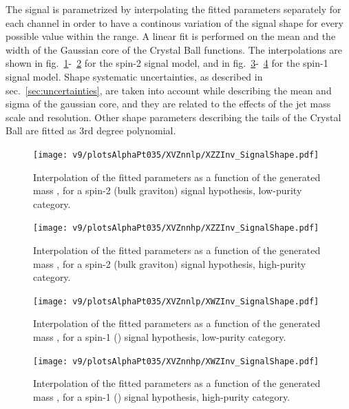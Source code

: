 The signal is parametrized by interpolating the fitted parameters separately for each channel in order to have a continous variation of the signal shape for every possible \mtVZ value within the range. A linear fit is performed on the mean and the width of the Gaussian core of the Crystal Ball functions. The interpolations are shown in fig.~\ref{fig:XZZ_SignalShapeLP}-~\ref{fig:XZZ_SignalShapeHP} for the spin-2 signal model, and in fig.~\ref{fig:XWZ_SignalShapeLP}-~\ref{fig:XWZ_SignalShapeHP} for the spin-1 signal model. Shape systematic uncertainties, as described in sec.~\ref{sec:uncertainties}, are taken into account while describing the mean and sigma of the gaussian core, and they are related to the effects of the jet mass scale and resolution. Other shape parameters describing the tails of the Crystal Ball are fitted as 3rd degree polynomial.


\begin{figure}[!htb]
  \centering
    \texttt{[image: v9/plotsAlphaPt035/XVZnnlp/XZZInv\_SignalShape.pdf]}
  \caption{Interpolation of the fitted parameters as a function of the generated mass \mtVZ, for a spin-2 (bulk graviton) signal hypothesis, low-purity category.}
  \label{fig:XZZ_SignalShapeLP}
\end{figure}

\begin{figure}[!htb]
  \centering
    \texttt{[image: v9/plotsAlphaPt035/XVZnnhp/XZZInv\_SignalShape.pdf]}

  \caption{Interpolation of the fitted parameters as a function of the generated mass \mtVZ, for a spin-2 (bulk graviton) signal hypothesis, high-purity category.}
  \label{fig:XZZ_SignalShapeHP}
\end{figure}

\begin{figure}[!htb]
  \centering
    \texttt{[image: v9/plotsAlphaPt035/XVZnnlp/XWZInv\_SignalShape.pdf]}
  \caption{Interpolation of the fitted parameters as a function of the generated mass \mtVZ, for a spin-1 (\Wp) signal hypothesis, low-purity category.}
  \label{fig:XWZ_SignalShapeLP}
\end{figure}

\begin{figure}[!htb]
  \centering
    \texttt{[image: v9/plotsAlphaPt035/XVZnnhp/XWZInv\_SignalShape.pdf]}

  \caption{Interpolation of the fitted parameters as a function of the generated mass \mtVZ, for a spin-1 (\Wp) signal hypothesis, high-purity category.}
  \label{fig:XWZ_SignalShapeHP}
\end{figure}


